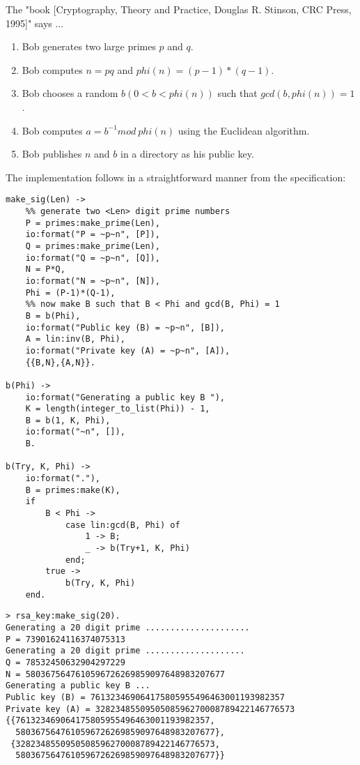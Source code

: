 \documentclass[10pt]{article}
\begin{document}
    The "book [Cryptography, Theory and  Practice, Douglas R. Stinson,
CRC Press, 1995]" says ...

\begin{enumerate} 
\item  Bob generates two large primes $p$ and $q$.
\item  Bob computes $n = pq$ and $phi(n) = (p-1)*(q-1)$.
\item  Bob chooses a random $b(0 < b < phi(n))$ such that
$gcd(b, phi(n)) = 1$.
\item  Bob computes $a = b^{-1} mod \: phi(n)$ using the Euclidean algorithm.
\item Bob publishes $n$ and  $b$ in a directory as his public key.
\end{enumerate}

The implementation follows in a straightforward manner from the
specification:

\begin{verbatim}
make_sig(Len) ->
    %% generate two <Len> digit prime numbers
    P = primes:make_prime(Len),
    io:format("P = ~p~n", [P]),
    Q = primes:make_prime(Len),
    io:format("Q = ~p~n", [Q]),
    N = P*Q,
    io:format("N = ~p~n", [N]),
    Phi = (P-1)*(Q-1),
    %% now make B such that B < Phi and gcd(B, Phi) = 1
    B = b(Phi),
    io:format("Public key (B) = ~p~n", [B]),
    A = lin:inv(B, Phi),
    io:format("Private key (A) = ~p~n", [A]),
    {{B,N},{A,N}}.

b(Phi) ->
    io:format("Generating a public key B "),
    K = length(integer_to_list(Phi)) - 1,
    B = b(1, K, Phi),
    io:format("~n", []),
    B.

b(Try, K, Phi) ->
    io:format("."),
    B = primes:make(K),
    if 
        B < Phi ->
            case lin:gcd(B, Phi) of
                1 -> B;
                _ -> b(Try+1, K, Phi)
            end;
        true ->
            b(Try, K, Phi)
    end.
\end{verbatim}

\begin{verbatim}
> rsa_key:make_sig(20). 
Generating a 20 digit prime .....................
P = 73901624116374075313
Generating a 20 digit prime ....................
Q = 78532450632904297229
N = 5803675647610596726269859097648983207677
Generating a public key B ...
Public key (B) = 761323469064175805955496463001193982357
Private key (A) = 3282348550950508596270008789422146776573
{{761323469064175805955496463001193982357,
  5803675647610596726269859097648983207677},
 {3282348550950508596270008789422146776573,
  5803675647610596726269859097648983207677}}
\end{verbatim}
\end{document}
